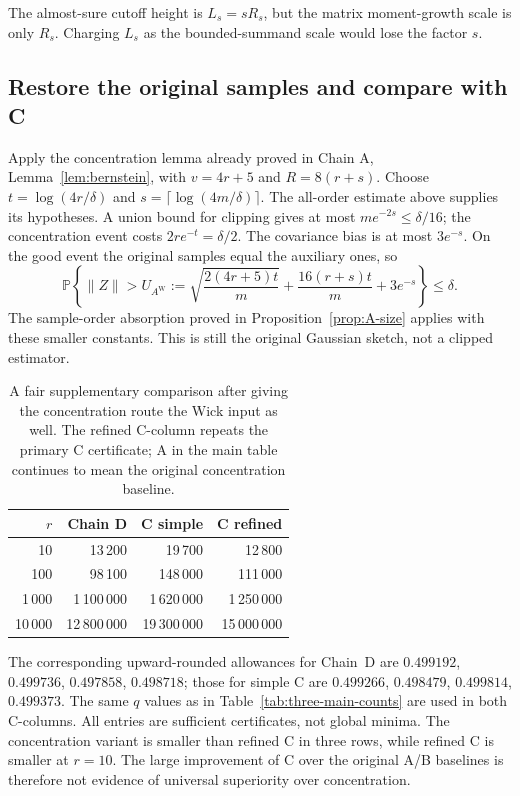 \documentclass[11pt]{article}
\numberwithin{equation}{section}
\theoremstyle{definition}\newtheorem{definition}[theorem]{Definition}
\theoremstyle{remark}\newtheorem{remark}[theorem]{Remark}
\begin{document}
\begin{takeaway}
The almost-sure cutoff height is $L_s=sR_s$, but the matrix moment-growth scale is
only $R_s$. Charging $L_s$ as the bounded-summand scale would lose the factor $s$.
\end{takeaway}


\subsection{Restore the original samples and compare with C}
Apply the concentration lemma already proved in Chain A,
Lemma~\ref{lem:bernstein}, with $v=4r+5$ and $R=8(r+s)$.
Choose $t=\log(4r/\delta)$ and $s=\lceil\log(4m/\delta)\rceil$.
The all-order estimate above supplies its hypotheses. A union bound for
clipping gives at most $me^{-2s}\le\delta/16$; the concentration event costs
$2re^{-t}=\delta/2$. The covariance bias is at most $3e^{-s}$.
On the good event the original samples equal the auxiliary ones, so
\begin{equation}\label{aw:eq:tail}
 \mathbb P\left\{\|Z\|>
 U_{A^{\mathrm W}}:=
 \sqrt{\frac{2(4r+5)t}{m}}+
 \frac{16(r+s)t}{m}+3e^{-s}\right\}\le\delta.
\end{equation}
The sample-order absorption proved in Proposition~\ref{prop:A-size} applies
with these smaller constants. This is still the original Gaussian sketch,
not a clipped estimator.

\begin{table}[H]\centering\small
\setlength{\tabcolsep}{10pt}\renewcommand{\arraystretch}{1.2}
\begin{tabular}{@{}rrrr@{}}
\toprule
$r$&\textbf{Chain D}&\textbf{C simple}&\textbf{C refined}\\
\midrule
10&13\,200&19\,700&12\,800\\
100&98\,100&148\,000&111\,000\\
1\,000&1\,100\,000&1\,620\,000&1\,250\,000\\
10\,000&12\,800\,000&19\,300\,000&15\,000\,000\\
\bottomrule
\end{tabular}
\caption{A fair supplementary comparison after giving the concentration route
the Wick input as well. The refined C-column repeats the primary C certificate;
A in the main table continues to mean the original concentration baseline.}
\label{tab:AWC}
\end{table}
The corresponding upward-rounded allowances for Chain~D are
$0.499192$, $0.499736$, $0.497858$, $0.498718$; those for simple C are
$0.499266$, $0.498479$, $0.499814$, $0.499373$.
The same $q$ values as in Table~\ref{tab:three-main-counts} are used in both C-columns.
All entries are sufficient certificates, not global minima. The concentration
variant is smaller than refined C in three rows, while refined C is smaller
at $r=10$. The large improvement of C over the original A/B baselines is
therefore not evidence of universal superiority over concentration.
\end{document}
